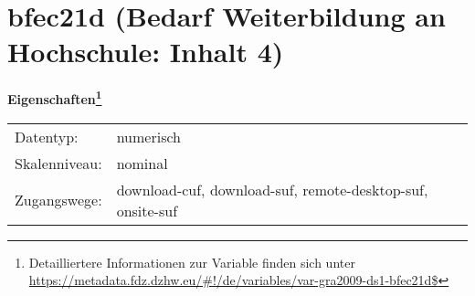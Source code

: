 
    \setcounter{footnote}{0}

    \vspace*{-1.8cm}
	\section{bfec21d (Bedarf Weiterbildung an Hochschule: Inhalt 4)}
	\label{section:bfec21d}



    \vspace*{0.5cm}
    \noindent\textbf{Eigenschaften\footnote{Detailliertere Informationen zur Variable finden sich unter
		\url{https://metadata.fdz.dzhw.eu/\#!/de/variables/var-gra2009-ds1-bfec21d$}}}\\
	\begin{tabularx}{\hsize}{@{}lX}
	Datentyp: & numerisch \\
	Skalenniveau: & nominal \\
	Zugangswege: &
	  download-cuf, 
	  download-suf, 
	  remote-desktop-suf, 
	  onsite-suf
 \\
    \end{tabularx}



